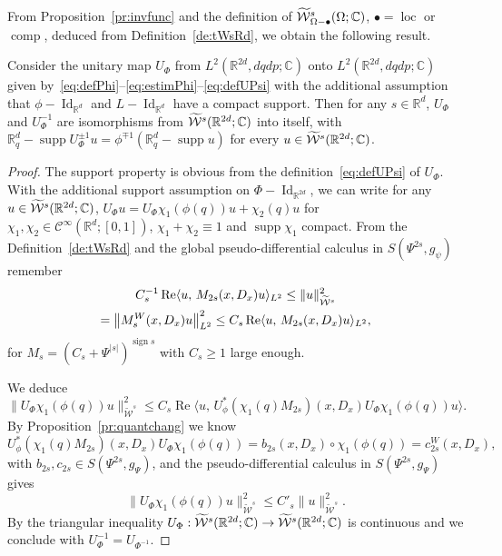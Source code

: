 \documentclass[10pt]{amsart}
\theoremstyle{definition}\newtheorem{defi}[theo]{Definition}\newtheorem{rema}[theo]{Remark}\newtheorem{exam}[theo]{Example}\newtheorem{exem}[theo]{Example}\newtheorem{nota}[theo]{Notation}
\newcommand{\C}{\mathbb{C}}
\newcommand{\R}{\mathbb{R}}
\newcommand{\clW}{\mathcal{W}}
\newcommand{\clC}{\mathcal{C}}
\DeclareMathOperator{\Ree}{Re}
\DeclareMathOperator{\ccomp}{comp}
\DeclareMathOperator{\suppp}{supp}
\DeclareMathOperator{\Idd}{Id}
\DeclareMathOperator{\locc}{loc}
\DeclareMathOperator{\ssign}{sign}
\let\oldtilde\tilde
\renewcommand*{\tilde}[1]{\mathchoice{\widetilde{#1}}{\widetilde{#1}}{\oldtilde{#1}}{\oldtilde{#1}}}
\let\originalleft\left
\let\originalright\right
\renewcommand{\left}{\mathopen{}\mathclose\bgroup\originalleft}
\renewcommand{\right}{\aftergroup\egroup\originalright}
\renewcommand*{\to}{\mathchoice{\longrightarrow}{\rightarrow}{\rightarrow}{\rightarrow}}
\begin{document}
From Proposition~\ref{pr:invfunc} and the definition of $\tilde{\clW}^{s}_{\Omega-\bullet}(\Omega;\C)$, $\bullet=\locc$ or $\ccomp$, deduced from Definition~\ref{de:tWsRd}, we obtain the following result.

\begin{prop}\label{pr:diffeoWsloc}
Consider the unitary map $U_{\Phi}$ from $L^{2}(\R^{2d},dqdp;\C)$ onto $ L^{2}(\R^{2d},dqdp;\C)$ given by~\eqref{eq:defPhi}--\eqref{eq:estimPhi}--\eqref{eq:defUPsi} with the additional assumption that $\phi-\Idd_{\R^{d}}$ and $L-\Idd_{\R^{d}}$ have a compact support. Then for any $s\in \R^{d}$, $U_{\Phi}$ and $U_{\Phi}^{-1}$ are isomorphisms from $\tilde{\clW}^{s}(\R^{2d};\C)$ into itself, with $\R^{d}_{q}-\suppp U_{\Phi}^{\pm 1}u=\phi^{\mp 1}(\R^{d}_{q}-\suppp u)$ for every $u\in \tilde{\clW}^{s}(\R^{2d};\C)$.
\end{prop}
\begin{proof}
The support property is obvious from the definition~\eqref{eq:defUPsi} of $U_{\Phi}$. With the additional support assumption on $\Phi-\Idd_{\R^{2d}}$, we can write for any $u\in \tilde{\clW}^{s}(\R^{2d};\C)$, $U_{\Phi}u=U_{\Phi}\chi_{1}(\phi(q))u + \chi_{2}(q)u$ for $\chi_{1},\chi_{2}\in \clC^{\infty}(\R^{d};[0,1])$, $\chi_{1}+\chi_{2}\equiv 1$ and $\suppp\chi_{1}$ compact. From the Definition~\ref{de:tWsRd} and the global pseudo-differential calculus in $S(\Psi^{2s},g_{\psi})$ remember
\begin{multline*}
C_{s}^{-1}\Ree\langle u,\, M_{2s}(x,D_{x})u\rangle_{L^{2}}\leq \|u\|_{\widetilde{\clW}^{s}}^{2}\\
=\left\|M_{s}^{W}(x,D_{x})u\right\|^{2}_{L^{2}}\leq C_{s}\Ree\langle u,\, M_{2s}(x,D_{x})u\rangle_{L^{2}},
\end{multline*}
for $M_{s}=(C_{s}+\Psi^{|s|})^{\ssign s}$ with $C_{s}\geq 1$ large enough.

We deduce
\[
\|U_{\Phi}\chi_{1}(\phi(q))u\|_{\widetilde{\clW}^{s}}^{2}\leq C_{s}\Ree\bigl\langle u,\, U_{\phi}^{*}(\chi_{1}(q)M_{2s})(x,D_{x})U_{\Phi}\chi_{1}(\phi(q))u\bigr\rangle.
\]
By Proposition~\ref{pr:quantchang} we know
\[
U_{\phi}^{*}(\chi_{1}(q)M_{2s})(x,D_{x})U_{\Phi}\chi_{1}(\phi(q))=b_{2s}(x,D_{x})\circ \chi_{1}(\phi(q))=c^{W}_{2s}(x,D_{x}),
\]
with $b_{2s},c_{2s}\in S(\Psi^{2s},g_{\Psi})$, and the pseudo-differential calculus in $S(\Psi^{2s},g_{\Psi})$ gives
\[
\|U_{\Phi}\chi_{1}(\phi(q))u\|_{\widetilde{\clW}^{s}}^{2}\leq C'_{s}\|u\|^{2}_{\widetilde{\clW}^{s}}.
\]
By the triangular inequality $U_{\Phi}:\tilde{\clW}^{s}(\R^{2d};\C)\to \tilde{\clW}^{s}(\R^{2d};\C)$ is continuous and we conclude with $U_{\Phi}^{-1}=U_{\Phi^{-1}}$.
\end{proof}
\end{document}
